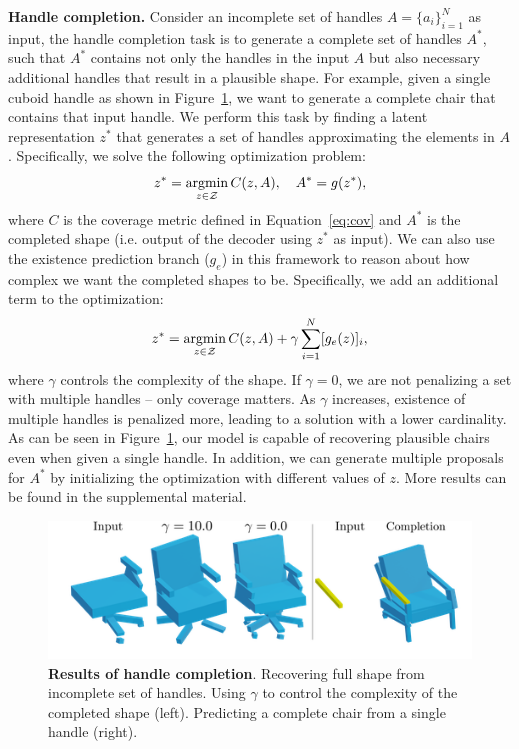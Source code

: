 \vspace{5pt}
\noindent\textbf{Handle completion.}
Consider an incomplete set of handles $A=\{a_i\}_{i=1}^{N}$ as input, the handle completion task is to generate a complete set of handles $A^*$,
such that $A^*$ contains not only the handles in the input $A$ but also necessary additional handles that result in a plausible shape.
For example, given a single cuboid handle as shown in Figure~\ref{fig:completion},
we want to generate a complete chair that contains that input handle.
We perform this task by finding a latent representation $z^*$ that generates a set of handles approximating the elements
in $A$. Specifically, we solve the following optimization problem:
\begin{equation}
   z^* = \argmin_{z \in \mathcal{Z}}C(z, A), \quad A^* = g(z^*),
   \label{eq:completion}
   \vspace{-5pt}
\end{equation}
where $C$ is the coverage metric defined in Equation~\ref{eq:cov} and $A^*$ is the completed shape (i.e. output of the decoder using $z^*$ as input).
We can also use the existence prediction branch ($g_e$) in this framework to reason
about how complex we want the completed shapes to be.
Specifically, we add an additional term to the optimization:
\begin{equation}
    \label{eq:completion}
   z^* = \argmin_{z \in \mathcal{Z}}C(z, A) + \gamma\sum_{i=1}^{N}[g_e(z)]_i,
   \vspace{-5pt}
\end{equation}
where $\gamma$ controls the complexity of the shape.
If $\gamma=0$, we are not penalizing a set with multiple handles -- only
coverage matters.
As $\gamma$ increases, existence of multiple handles is penalized more, leading to a solution with a lower cardinality.
As can be seen in Figure~\ref{fig:completion}, our model is capable of recovering plausible chairs even when given a single handle. In addition, we can generate multiple proposals for $A^*$ by initializing the optimization with different values of $z$. More results can be found in the supplemental material. 

\begin{figure}
\centering
\includegraphics[width=1.0\linewidth]{handles/imgs/completion.png}
\vspace{-18pt}
\caption{\label{fig:completion} \small
\textbf{Results of handle completion}.
Recovering full shape from incomplete set of handles.
Using $\gamma$ to control the complexity of the completed shape (left).
Predicting a complete chair from a single handle (right).
}
\vspace{-0.1in}
\end{figure}

